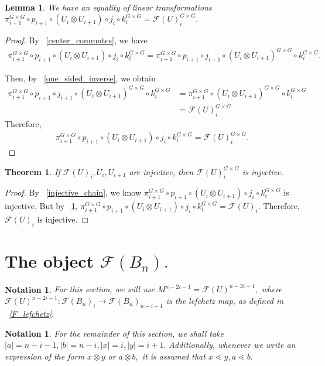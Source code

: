 \documentclass{amsart}
\newtheorem{lem}[subsubsection]{Lemma}
\newtheorem{thm}[subsubsection]{Theorem}
\newtheorem{note}[subsubsection]{Notation}
\begin{document}
\begin{lem}
\label{two_equivalent_paths}
We have an equality of linear transformations $\pi^{G\times G}_{i+1}\circ p_{i+1}\circ(U_i\otimes U_{i+1})\circ j_i\circ k^{G\times G}_i = \mathcal F(U)^{G\times G}_i.$
\end{lem}
\begin{proof}
By ~\ref{center_commutes}, we have
\begin{align*}
	\pi^{G\times G}_{i+1}\circ p_{i+1}\circ(U_i\otimes U_{i+1})\circ j_i\circ k^{G\times G}_i = \pi^{G\times G}_{i+1}\circ p_{i+1}\circ j_{i+1}\circ(U_i\otimes U_{i+1})^{G\times G}\circ k^{G\times G}_i.
\end{align*}

Then, by ~\ref{one_sided_inverse}, we obtain
\begin{align*}
	\pi^{G\times G}_{i+1}\circ p_{i+1}\circ j_{i+1}\circ(U_i\otimes U_{i+1})^{G\times G}\circ k^{G\times G}_i &= \pi^{G\times G}_{i+1}\circ(U_i\otimes U_{i+1})^{G\times G}\circ k^{G\times G}_i\\
	&= \mathcal F(U)^{G\times G}_i
\end{align*}
Therefore,
\begin{align*}
	\pi^{G\times G}_{i+1}\circ p_{i+1}\circ(U_i\otimes U_{i+1})\circ j_i\circ k^{G\times G}_i = \mathcal F(U)^{G\times G}_i.
\end{align*}
\end{proof}

\begin{thm}
\label{injectivity_thm}
If $\mathcal F(U)_i,U_i,U_{i+1}$ are injective, then $\mathcal F(U)^{G\times G}_i$ is injective.
\end{thm}
\begin{proof}
By ~\ref{injective_chain}, we know $\pi^{G\times G}_{i+1}\circ p_{i+1}\circ(U_i\otimes U_{i+1})\circ j_i\circ k^{G\times G}_i$ is injective. But by ~\ref{two_equivalent_paths}, $\pi^{G\times G}_{i+1}\circ p_{i+1}\circ(U_i\otimes U_{i+1})\circ j_i\circ k^{G\times G}_i = \mathcal F(U)_i.$ Therefore, $\mathcal F(U)_i$ is injective.
\end{proof}

\section{The object $\mathcal F(B_n).$}

\begin{note}
For this section, we will use $M^{n-2i-1} = \mathcal F(U)^{n-2i-1},$ where $\mathcal F(U)^{n-2i-1}:\mathcal F(B_n)_i \rightarrow \mathcal F(B_n)_{n-i-1}$ is the lefchetz map, as defined in ~\ref{F_lefchetz}.
\end{note}
\begin{note}
For the remainder of this section, we shall take $|a| = n-i-1,|b|= n-i,|x| = i,|y| = i+1.$ Additionally, whenever we write an expression of the form $x \otimes y$ or $a \otimes b,$ it is assumed that $x \lessdot y,a \lessdot b.$
\end{note}
\end{document}
